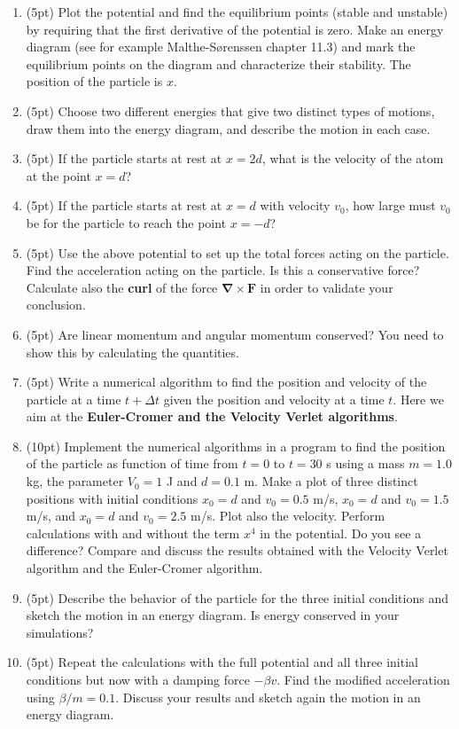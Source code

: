 \documentclass[%
oneside,                 %
final,                   %
10pt]{article}
\begin{document}
\begin{enumerate}
\item (5pt) Plot the potential and find the  equilibrium points (stable and unstable) by requiring that the first derivative of the potential is zero. Make an energy diagram (see for example Malthe-Sørenssen chapter 11.3) and mark the equilibrium points on the diagram and characterize their stability. The position of the particle is $x$. 

\item (5pt) Choose two different energies that give two distinct types of motions, draw them into the energy diagram, and describe the motion in each case.

\item (5pt) If the particle  starts at rest at $x=2d$, what is the velocity of the atom at the point $x=d$?

\item (5pt) If the particle  starts at rest at $x=d$ with velocity $v_0$, how large must $v_0$ be for the  particle to reach the point $x=−d$?

\item (5pt) Use the above potential to set up the total forces acting on the particle.  Find the acceleration acting on the particle. Is this a conservative force? Calculate also the \textbf{curl} of the force  $\bm{\nabla}\times \bm{F}$ in order to validate your conclusion. 

\item (5pt) Are linear momentum and angular momentum conserved? You need to show this by calculating the quantities.

\item (5pt) Write a numerical algorithm to find the position and velocity of the particle at a time $t+\Delta t$ given the position and velocity at a time $t$. Here we aim at the \textbf{Euler-Cromer and the Velocity Verlet algorithms}.   

\item (10pt) Implement the numerical algorithms in a program to find the position of the particle as function of time from $t=0$ to $t=30$ s using a mass  $m=1.0$ kg, the parameter $V_0=1$ J and $d=0.1$ m. Make a plot of three distinct positions with initial conditions $x_0=d$ and $v_0=0.5$ m/s, $x_0=d$ and $v_0=1.5$ m/s, and $x_0=d$ and $v_0=2.5$ m/s. Plot also the velocity.  Perform calculations with and without the term $x^4$ in the potential. Do you see a difference? Compare and discuss the results obtained with the Velocity Verlet algorithm and the Euler-Cromer algorithm. 

\item (5pt) Describe the behavior of the particle for the three initial conditions  and sketch the motion in an energy diagram. Is energy conserved in your simulations?

\item (5pt) Repeat the calculations with the full potential and all three initial conditions but now with a damping force $-\beta v$. Find the modified acceleration using $\beta/m=0.1$. Discuss your results and sketch again the motion in an energy diagram.
\end{enumerate}
\end{document}
